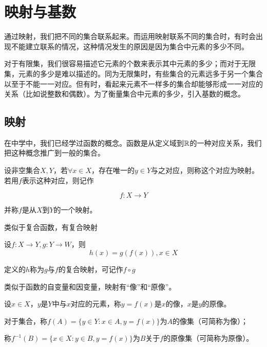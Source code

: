 \section{映射与基数}

通过映射，我们把不同的集合联系起来。而运用映射联系不同的集合时，有时会出现不能建立联系的情况，这种情况发生的原因是因为集合中元素的多少不同。

对于有限集，我们很容易描述它元素的个数来表示其中元素的多少；而对于无限集，元素的多少是难以描述的。同为无限集时，有些集合的元素远多于另一个集合以至于不能一一对应。但有时，看起来元素不一样多的集合却能够形成一一对应的关系（比如说整数和偶数）。为了衡量集合中元素的多少，引入基数的概念。

\subsection{映射}

在中学中，我们已经学过函数的概念。函数是从定义域到$\mathbb{R}$的一种对应关系，我们把这种概念推广到一般的集合。

\begin{definition}[映射]
    设非空集合$X,Y$，若$\forall x\in X$，存在唯一的$y\in Y$与之对应，则称这个对应为映射。若用$f$表示这种对应，则记作

    \begin{equation*}
        f:X\rightarrow Y
    \end{equation*}

    并称$f$是从$X$到$Y$的一个映射。
\end{definition}

类似于复合函数，有复合映射

\begin{definition}
    设$f:X\rightarrow Y,g:Y\rightarrow W$，则
    \[h(x) = g(f(x)),x\in X \]

    定义的$h$称为$g$与$f$的复合映射，可记作$f\circ g$
\end{definition}

类似于函数的自变量和因变量，映射有“像”和“原像”。

\begin{definition}[像、原像]
    设$x\in X$，$y$是$Y$中与$x$对应的元素，称$y=f(x)$是$x$的像，$x$是$y$的原像。
    
    对于集合，称$f(A)=\{y\in Y:x\in A,y=f(x)\}$为$A$的像集（可简称为像）；

    称$f^{-1}(B)=\{x\in X:y\in B,y=f(x)\}$为$B$关于$f$的原像集（可简称为原像）。
\end{definition}

